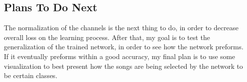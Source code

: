 \documentclass{article}
\begin{document}
\subsection{Plans To Do Next}
The normalization of the channels is the next thing to do, in order to decrease overall loss on the learning process. After that, my goal is to test the generalization of the trained network, in order to see how the network preforms. If it eventually preforms within a good accuracy, my final plan is to use some visualization to best present how the songs are being selected by the network to be certain classes.
\end{document}
